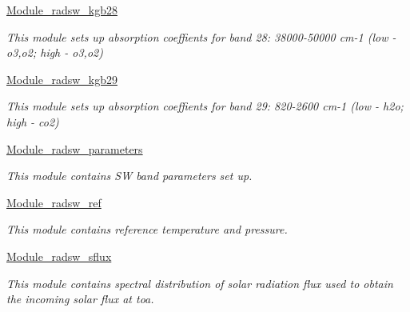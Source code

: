 \begin{DoxyCompactItemize}
\hyperlink{group__module__radsw__kgb28}{Module\+\_\+radsw\+\_\+kgb28}
\begin{DoxyCompactList}\small\item\em This module sets up absorption coeffients for band 28\+: 38000-\/50000 cm-\/1 (low -\/ o3,o2; high -\/ o3,o2) \end{DoxyCompactList}\item 
\hyperlink{group__module__radsw__kgb29}{Module\+\_\+radsw\+\_\+kgb29}
\begin{DoxyCompactList}\small\item\em This module sets up absorption coeffients for band 29\+: 820-\/2600 cm-\/1 (low -\/ h2o; high -\/ co2) \end{DoxyCompactList}\item 
\hyperlink{group__module__radsw__parameters}{Module\+\_\+radsw\+\_\+parameters}
\begin{DoxyCompactList}\small\item\em This module contains SW band parameters set up. \end{DoxyCompactList}\item 
\hyperlink{group__module__radsw__ref}{Module\+\_\+radsw\+\_\+ref}
\begin{DoxyCompactList}\small\item\em This module contains reference temperature and pressure. \end{DoxyCompactList}\item 
\hyperlink{group__module__radsw__sflux}{Module\+\_\+radsw\+\_\+sflux}
\begin{DoxyCompactList}\small\item\em This module contains spectral distribution of solar radiation flux used to obtain the incoming solar flux at toa. \end{DoxyCompactList}\end{DoxyCompactItemize}
